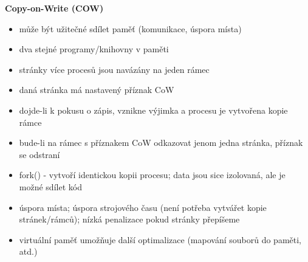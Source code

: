 \documentclass[10pt,a4paper]{article}
\begin{document}
\textbf{Copy-on-Write (COW)}
\begin{itemize}
	\item může být užitečné sdílet paměť (komunikace, úspora místa)
	\item dva stejné programy/knihovny v paměti
	\item stránky více procesů jsou navázány na jeden rámec
	\item daná stránka má nastavený příznak CoW
	\item dojde-li k pokusu o zápis, vznikne výjimka a procesu je vytvořena kopie rámce
	\item bude-li na rámec s příznakem CoW odkazovat jenom jedna stránka, příznak se odstraní
	\item fork() - vytvoří identickou kopii procesu; data jsou sice izolovaná, ale je možné sdílet kód
	\item úspora místa; úspora strojového času (není potřeba vytvářet kopie stránek/rámců); nízká
penalizace pokud stránky přepíšeme
	\item virtuální paměť umožňuje další optimalizace (mapování souborů do paměti, atd.)
\end{itemize}
\end{document}
